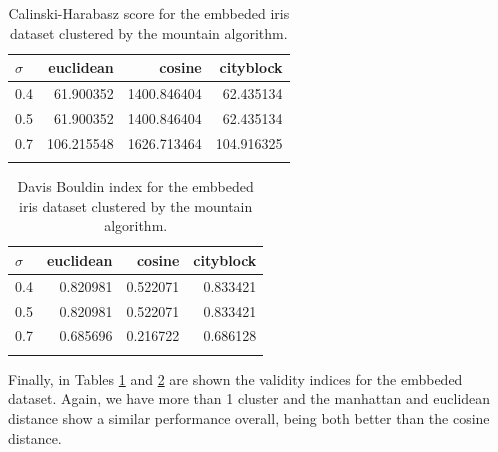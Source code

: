 \documentclass[conference]{IEEEtran}
\begin{document}
\begin{itemize}
    \begin{table}[ht!]
        \centering
        \begin{tabular}{lrrr}
        \toprule
        $\sigma$ &   euclidean &       cosine &   cityblock \\
        \midrule
        0.4 &   61.900352 &  1400.846404 &   62.435134 \\
        0.5 &   61.900352 &  1400.846404 &   62.435134 \\
        0.7 &  106.215548 &  1626.713464 &  104.916325 \\
        \bottomrule \\
        \end{tabular}

        \caption{Calinski-Harabasz score for the embbeded iris dataset clustered by the mountain algorithm.}
        \label{tab:ie_ch_m}
    \end{table}
    
    \begin{table}[ht!]
        \centering
        \begin{tabular}{lrrr}
        \toprule
        $\sigma$ &  euclidean &    cosine &  cityblock \\
        \midrule
        0.4 &   0.820981 &  0.522071 &   0.833421 \\
        0.5 &   0.820981 &  0.522071 &   0.833421 \\
        0.7 &   0.685696 &  0.216722 &   0.686128 \\
        \bottomrule \\
        \end{tabular}
        \caption{Davis Bouldin index for the embbeded iris dataset clustered by the mountain algorithm.}
        \label{tab:ie_db_m}
    \end{table}
    
    Finally, in Tables \ref{tab:ie_ch_m} and \ref{tab:ie_db_m} are shown the validity indices for the embbeded dataset. Again, we have more than 1 cluster and the manhattan and euclidean distance show a similar performance overall, being both better than the cosine distance.
\end{itemize}
\end{document}
